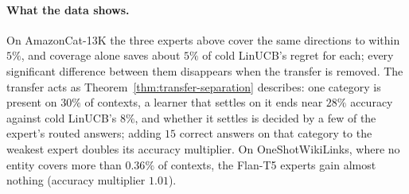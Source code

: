 \documentclass{article}
\theoremstyle{definition}
\theoremstyle{remark}
\theoremstyle{remark}
\begin{document}
\paragraph{What the data shows.}
On AmazonCat-13K the three experts above cover the same directions to within
$5\%$, and coverage alone saves about $5\%$ of cold LinUCB's regret for each;
every significant difference between them disappears when the transfer is
removed. The transfer acts as Theorem~\ref{thm:transfer-separation}
describes: one category is present on $30\%$ of contexts, a learner that
settles on it ends near $28\%$ accuracy against cold LinUCB's $8\%$, and
whether it settles is decided by a few of the expert's routed answers; adding
$15$ correct answers on that category to the weakest expert doubles its
accuracy multiplier. On OneShotWikiLinks, where no entity covers more than
$0.36\%$ of contexts, the Flan-T5 experts gain almost nothing (accuracy
multiplier $1.01$).
\end{document}
